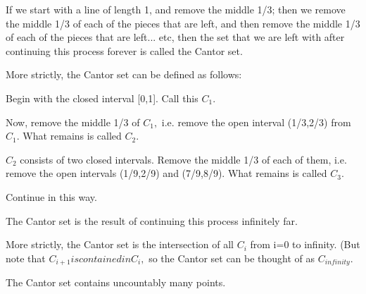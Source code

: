 If we start with a line of length 1, and remove the middle 1/3; then
we remove the middle 1/3 of each of the pieces that are left, and then remove the
middle 1/3 of each of the pieces that are left... etc, then the set that we are left
with after continuing this process forever is called the Cantor set.
\par
More strictly, the Cantor set can be defined as follows:
\par
Begin with the closed interval [0,1]. Call this $C_{1}.$ 
\par
Now, remove the middle 1/3 of $C_{1},$  i.e. remove 
the open interval (1/3,2/3) from $C_{1}.$  What remains is
called $C_{2}.$  
\par
$C_{2}$  consists of two closed intervals. Remove the middle 1/3 
of each of them, i.e. remove the open intervals (1/9,2/9) and 
(7/9,8/9). What remains is called $C_{3}.$ 
\par
Continue in this way.             
\par
The Cantor set is the result of continuing this process infinitely far.
\par
More strictly, the Cantor set is the intersection of all $C_{i}$ 
from i=0 to infinity. (But note that $C_{i+1} is contained in C_{i},$ 
so the Cantor set can be thought of as $C_{infinity}.$ 
\par
The Cantor set contains uncountably many points.